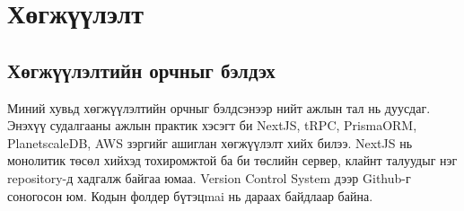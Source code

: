 \section{Хөгжүүлэлт}

\subsection{Хөгжүүлэлтийн орчныг бэлдэх}
Миний хувьд хөгжүүлэлтийн орчныг бэлдсэнээр нийт ажлын тал нь дуусдаг. Энэхүү судалгааны ажлын практик хэсэгт би NextJS, tRPC, PrismaORM, PlanetscaleDB, AWS зэргийг ашиглан хөгжүүлэлт хийх билээ. NextJS нь монолитик төсөл хийхэд тохиромжтой ба би төслийн сервер, клайнт талуудыг нэг repository-д хадгалж байгаа юмаа. Version Control System дээр Github-г соногосон юм. Кодын фолдер бүтэцmai нь дараах байдлаар байна.

